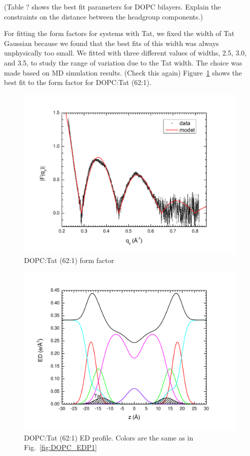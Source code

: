 (Table ? shows the best fit parameters for DOPC bilayers. Explain the 
constraints on the distance between the headgroup components.)

For fitting the form factors for systems with Tat, we fixed the width of Tat 
Gaussian because we found that the best fits of this width was always 
unphysically too small. We fitted with three different values of widths,
2.5, 3.0, and 3.5, to study the range of variation due to the Tat width. 
The choice was made based on MD simulation results. (Check this again)
Figure~\ref{fig:DOPC_Tat_62to1_3.0_XFF1} shows the best fit to the 
form factor for DOPC:Tat (62:1). 
\begin{figure}[htbp]
  \centering
  \includegraphics[scale=0.3]{./figures/Tat/SDP_Results/DOPC_Tat_62to1_3_XFF1.pdf}
  \caption{DOPC:Tat (62:1) form factor}
  \label{fig:DOPC_Tat_62to1_3.0_XFF1}
\end{figure}
\begin{figure}[htbp]
  \centering
  \includegraphics[scale=0.3]{./figures/Tat/SDP_Results/DOPC_Tat_62to1_3_EDP1.pdf}
  \caption{DOPC:Tat (62:1) ED profile. Colors are the same as in 
  Fig.~\ref{fig:DOPC_EDP1}}
  \label{fig:DOPC_Tat_62to1_3.0_EDP1}
\end{figure}
